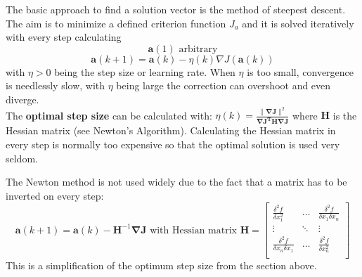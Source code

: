       The basic approach to find a solution vector is the method of steepest descent. The aim is to
      minimize a defined criterion function $J_a$ and it is solved iteratively with every step calculating
      $$\bm a (1) \text{ arbitrary}$$
      $$\bm a (k+1) =  \bm a(k) - \eta(k) \nabla J(\bm a(k))$$
      with $\eta > 0$ being the step size or learning rate. When $\eta$ is too small, convergence is
      needlessly slow, with $\eta$ being large the correction can overshoot and even diverge.\\
      The \textbf{optimal step size} can be calculated with:
      $\eta(k)= \frac{\|\bm{\nabla J}\|^2}{\bm{\nabla J^T  H \nabla J}}$ where $\bm H$ is the Hessian matrix (see Newton's Algorithm).
      Calculating the Hessian matrix in every step is normally too expensive so that the optimal solution is used very seldom.

      The Newton method is not used widely due to the fact that a matrix has to be inverted on every
      step:
      $$\bm a(k+1) = \bm a(k) - \bm H^{-1} \bm \nabla \bm J \text{ with Hessian matrix } \bm H = \begin{bmatrix}
      \frac{\delta^2 f}{\delta x_1^2} & \ldots & \frac{\delta^2 f}{\delta x_1 \delta x_n}\\
      \vdots & \ddots & \vdots \\
      \frac{\delta^2 f}{\delta x_n \delta x_1} & \ldots & \frac{\delta^2 f}{\delta x_n^2}\\
      \end{bmatrix}$$
      This is a simplification of the optimum step size from the section above.
  
